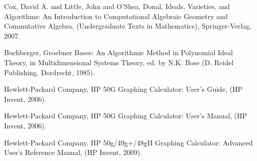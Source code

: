 \documentclass[12pt,a4paper]{report}
\numberwithin{theorem}{chapter}
\begin{document}
\begin{thebibliography}{1}

   Cox, David A. and Little, John and O'Shea, Donal,
    Ideals, Varieties, and Algorithms: An Introduction to
    Computational Algebraic Geometry and Commutative Algebra,
    (Undergraduate Texts in Mathematics), Springer-Verlag, 2007.

   Buchberger, Groebner Bases: An Algorithmic Method in
    Polynomial Ideal Theory, in Multidimensional Systems Theory,
    ed. by N.K. Bose (D. Reidel Publishing, Dordrecht, 1985).

   Hewlett-Packard Company, HP 50G Graphing
    Calculator: User's Guide, (HP Invent, 2006).

   Hewlett-Packard Company, HP 50G Graphing
    Calculator: User's Manual, (HP Invent, 2006).

   Hewlett-Packard Company, HP 50g/49g+/48gII
    Graphing Calculator: Advanced User’s Reference Manual, (HP Invent,
    2009).

\end{thebibliography}
\end{document}

